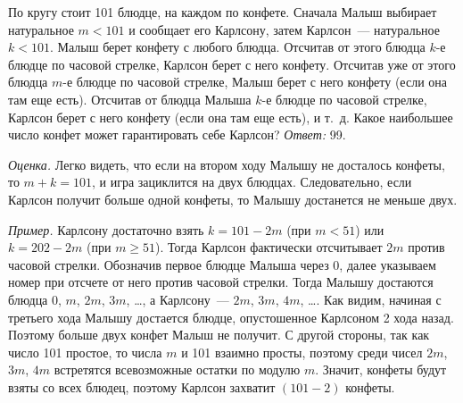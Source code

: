 \problem
По кругу стоит 101 блюдце, на каждом по конфете.
Сначала Малыш выбирает натуральное $m < 101$ и сообщает его Карлсону,
затем Карлсон~--- натуральное $k < 101$.
Малыш берет конфету с любого блюдца.
Отсчитав от этого блюдца $k$-е блюдце по часовой стрелке,
Карлсон берет с него конфету.
Отсчитав уже от этого блюдца $m$-е блюдце по часовой стрелке,
Малыш берет с него конфету (если она там еще есть).
Отсчитав от блюдца Малыша $k$-е блюдце по часовой стрелке,
Карлсон берет с него конфету (если она там еще есть), и т.~д.
Какое наибольшее число конфет может гарантировать себе Карлсон?
\solution
\emph{Ответ:} 99.
\par
\emph{Оценка.}
Легко видеть, что если на втором ходу Малышу не досталось конфеты,
то $m + k = 101$, и игра зациклится на двух блюдцах.
Следовательно, если Карлсон получит больше одной конфеты, то Малышу
достанется не меньше двух.
\par
\emph{Пример.}
Карлсону достаточно взять $k = 101 - 2 m$ (при $m < 51$) или $k = 202 - 2 m$
(при $m \geq 51$).
Тогда Карлсон фактически отсчитывает $2 m$ против часовой стрелки.
Обозначив первое блюдце Малыша через 0, далее указываем номер при отсчете от
него против часовой стрелки.
Тогда Малышу достаются блюдца $0$, $m$, $2 m$, $3 m$, \ldots,
а Карлсону~--- $2 m$, $3 m$, $4 m$, \ldots.
Как видим, начиная с третьего хода Малышу достается блюдце, опустошенное
Карлсоном 2 хода назад.
Поэтому больше двух конфет Малыш не получит.
С другой стороны, так как число 101 простое, то числа $m$ и 101 взаимно просты,
поэтому среди чисел $2 m$, $3 m$, $4 m$ встретятся всевозможные остатки по
модулю $m$.
Значит, конфеты будут взяты со всех блюдец, поэтому Карлсон захватит
$(101 - 2)$ конфеты.
\endproblem
